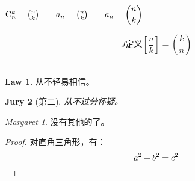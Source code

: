 \documentclass[]{ctexart}
\theoremstyle{definition}\newtheorem{laws}{Law}[section]
\theoremstyle{plain}\newtheorem{ju}[laws]{Jury}
\theoremstyle{remark}\newtheorem*{marg}{Margaret}
\begin{document}
	
	
	$\mathrm{C}_n^k=\binom{n}{k}
		\qquad
	 a_n = \tbinom{n}{k}
	 	\qquad
	 a_n = \dbinom{n}{k}
	$ \\
	
	\newcommand{\Bfrac}[2]{\genfrac{[}{]}{0}{}{#1}{#2}}
	
	\[
J		\text{定义} \Bfrac{n}{k} = \binom{k}{n}
	\] \\
	
	
	\begin{laws}
		从不轻易相信。
	\end{laws}
	\begin{ju}[第二]
		从不过分怀疑。
	\end{ju}
	\begin{marg}
		没有其他的了。
	\end{marg}
	
	\begin{proof}
		对直角三角形，有：
		\[a^2 + b^2 = c^2 \qedhere \]
	\end{proof}

	
\end{document}

